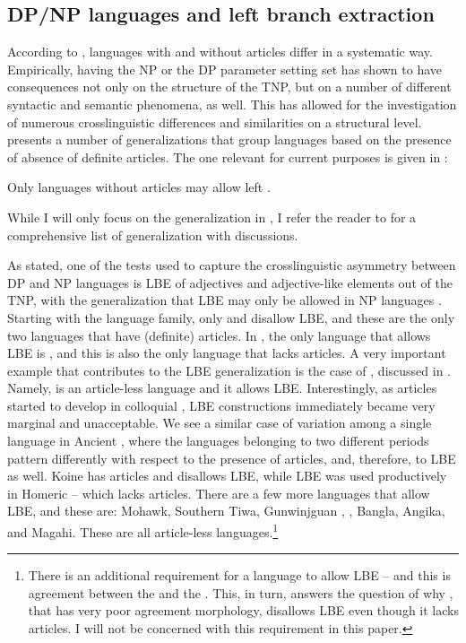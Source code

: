 \documentclass[output=paper,hidelinks,newtxmath,]{langscibook}
\begin{document}
\subsection{DP/NP languages and left branch extraction}\label{15:s3.2}

According to \citet{Boskovic2008,Boskovic2012}, languages with and without articles differ in a systematic way. Empirically, having the NP or the DP parameter setting set has shown to have consequences not only on the structure of the TNP, but on a number of different syntactic and semantic phenomena, as well. This has allowed for the investigation of numerous crosslinguistic differences and similarities on a structural level. \citet{Boskovic2008,Boskovic2012} presents a number of generalizations that group languages based on the presence of absence of definite articles. The one relevant for current purposes is given in :

\ea\label{15:ex1}
  Only languages without articles may allow left .
\z

\noindent While I will only focus on the generalization in , I refer the reader to \citet{Boskovic2008,Boskovic2012} for a comprehensive list of generalization with discussions.

As stated, one of the tests used to capture the crosslinguistic asymmetry between DP and NP languages is LBE of adjectives and adjective-like elements out of the TNP, with the generalization that LBE may only be allowed in NP languages \citet{Boskovic2008,Boskovic2012}. Starting with the  language family, only  and  disallow LBE, and these are the only two languages that have (definite) articles. In , the only language that allows LBE is , and this is also the only  language that lacks articles. A very important example that contributes to the LBE generalization is the case of , discussed in \citet{Franks2007}. Namely,  is an article-less language and it allows LBE. Interestingly, as articles started to develop in colloquial , LBE constructions immediately became very marginal and unacceptable. We see a similar case of variation among a single language in Ancient , where the languages belonging to two different periods pattern differently with respect to the presence of articles, and, therefore, to LBE as well. Koine  has articles and disallows LBE, while LBE was used productively in Homeric  – which lacks articles. There are a few more languages that allow LBE, and these are: Mohawk, Southern Tiwa, Gunwinjguan \citep{Baker1996}, , Bangla, Angika, and Magahi. These are all article-less languages.\largerpage\footnote{\label{15:fn2}There is an additional requirement for a language to allow LBE -- and this is agreement between the  and the . This, in turn, answers the question of why , that has very poor agreement morphology, disallows LBE even though it lacks articles. I will not be concerned with this requirement in this paper.}
\end{document}
